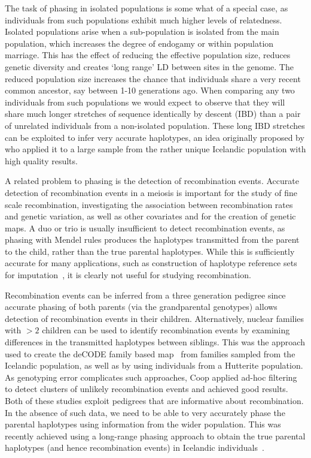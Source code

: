The task of phasing in isolated populations is some what of a special case, as individuals from such populations exhibit much higher levels of relatedness. Isolated populations arise when a sub-population is isolated from the main population, which increases the degree of endogamy or within population marriage. This has the effect of reducing the effective population size, reduces genetic diversity and creates `long range' LD between sites in the genome. The reduced population size increases the chance that individuals share a very recent common ancestor, say between 1-10 generations ago. When comparing any two individuals from such populations we would expect to observe that they will share much longer stretches of sequence identically by descent (IBD) than a pair of unrelated individuals from a  non-isolated population.  These long IBD stretches can be exploited to infer very accurate haplotypes, an idea originally proposed by \cite{kong2008detection} who applied it to a large sample from the rather unique Icelandic population with high quality results.

A related problem to phasing is the detection of recombination events. Accurate detection of recombination events in a meiosis is important for the study of fine scale recombination, investigating the association between recombination rates and genetic variation, as well as other covariates and for the creation of genetic maps.  A duo or trio is usually insufficient to detect recombination events, as phasing with Mendel rules produces the haplotypes transmitted from the parent to the child, rather than the true parental haplotypes.  While this is sufficiently accurate for many applications, such as construction of haplotype reference sets~\citep{InternationalHapMapConsortium:2005cu} for imputation~\citep{marchini2010genotype}, it is clearly not useful for studying recombination.  

Recombination events can be inferred from a three generation pedigree since accurate phasing of both parents (via the grandparental genotypes) allows detection of recombination events in their children.  Alternatively, nuclear families with $>2$ children can be used to identify recombination events by examining differences in the transmitted haplotypes between siblings.  This was the approach used to create the deCODE family based map~\citep{kong2002} from families sampled from the Icelandic population, as well as by \cite{coop2008high} using individuals from a Hutterite population.  As genotyping error complicates such approaches, Coop applied ad-hoc filtering to detect clusters of unlikely recombination events and achieved good results.  Both of these studies exploit pedigrees that are informative about recombination.  In the absence of such data, we need to be able to very accurately phase the parental haplotypes using information from the wider population. This was recently achieved using a long-range phasing approach to obtain the true parental haplotypes (and hence recombination events) in Icelandic individuals~\citep{kong2010fine}.  

